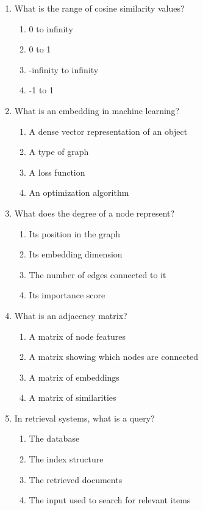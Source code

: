 \documentclass[12pt,a4paper]{article}
\begin{document}
\begin{enumerate}
\item What is the range of cosine similarity values?
\begin{enumerate}[label=\Alph*)]
    \item 0 to infinity
    \item 0 to 1
    \item -infinity to infinity
    \item -1 to 1
\end{enumerate}

\item What is an embedding in machine learning?
\begin{enumerate}[label=\Alph*)]
    \item A dense vector representation of an object
    \item A type of graph
    \item A loss function
    \item An optimization algorithm
\end{enumerate}

\item What does the degree of a node represent?
\begin{enumerate}[label=\Alph*)]
    \item Its position in the graph
    \item Its embedding dimension
    \item The number of edges connected to it
    \item Its importance score
\end{enumerate}

\item What is an adjacency matrix?
\begin{enumerate}[label=\Alph*)]
    \item A matrix of node features
    \item A matrix showing which nodes are connected
    \item A matrix of embeddings
    \item A matrix of similarities
\end{enumerate}

\item In retrieval systems, what is a query?
\begin{enumerate}[label=\Alph*)]
    \item The database
    \item The index structure
    \item The retrieved documents
    \item The input used to search for relevant items
\end{enumerate}


\end{enumerate}
\end{document}
